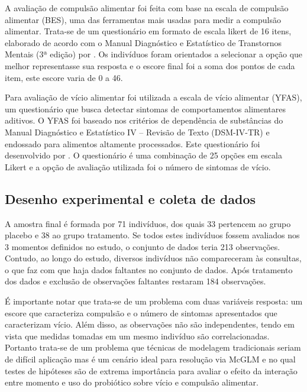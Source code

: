 \documentclass[AMA,STIX1COL]{WileyNJD-v2}
\begin{document}
A avaliação de compulsão alimentar foi feita com base na escala de compulsão alimentar (BES), uma das ferramentas mais usadas para medir a compulsão alimentar. Trata-se de um questionário em formato de escala likert de 16 itens, elaborado de acordo com o Manual Diagnóstico e Estatístico de Transtornos Mentais (3ª edição) \citep{spitzer1980diagnostic} por \citet{gormally1982assessment}. Os indivíduos foram orientados a selecionar a opção que melhor representasse sua resposta e o escore final foi a soma dos pontos de cada item, este escore varia de 0 a 46.

Para avaliação de vício alimentar foi utilizada a escala de vício alimentar (YFAS), um questionário que busca detectar sintomas de comportamentos alimentares aditivos. O YFAS foi baseado nos critérios de dependência de substâncias do Manual Diagnóstico e Estatístico IV – Revisão de Texto (DSM-IV-TR) \citep{segal2010diagnostic} e endossado para alimentos altamente processados. Este questionário foi desenvolvido por \citet{gearhardt2009preliminary}. O questionário é uma combinação de 25 opções em escala Likert e a opção de avaliação utilizada foi o número de sintomas de vício.

\subsection{Desenho experimental e coleta de dados}

A amostra final é formada por 71 indivíduos, dos quais 33 pertencem ao grupo placebo e 38 ao grupo tratamento. Se todos estes indivíduos fossem avaliados nos 3 momentos definidos no estudo, o conjunto de dados teria 213 observações. Contudo, ao longo do estudo, diversos indivíduos não compareceram às consultas, o que faz com que haja dados faltantes no conjunto de dados. Após tratamento dos dados e exclusão de observações faltantes restaram 184 observações.

É importante notar que trata-se de um problema com duas variáveis resposta: um escore que caracteriza compulsão e o número de sintomas apresentados que caracterizam vício. Além disso, as observações não são independentes, tendo em vista que medidas tomadas em um mesmo indivíduo são correlacionadas. Portanto trata-se de um problema que técnicas de modelagem tradicionais seriam de difícil aplicação mas é um cenário ideal para resolução via McGLM e no qual testes de hipóteses são de extrema importância para avaliar o efeito da interação entre momento e uso do probiótico sobre vício e compulsão alimentar.
\end{document}
